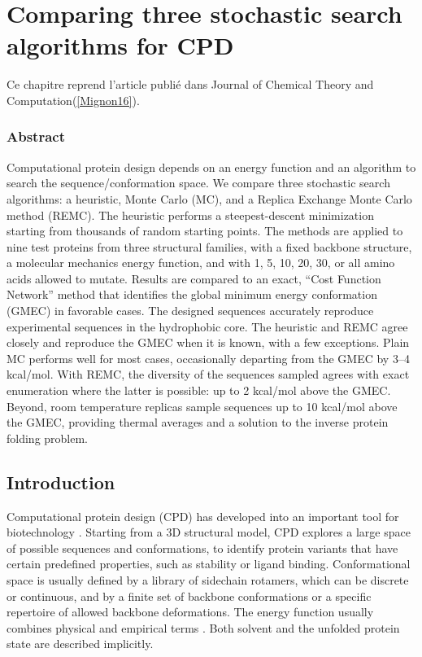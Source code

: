 \chapter{Comparing three stochastic search algorithms for CPD}
\label{chap:Comparaison}


Ce chapitre reprend l'article publié dans \og Journal of Chemical Theory and Computation\fg (\ref{Mignon16}).


\subsection*{Abstract}
Computational protein design depends on an energy function and an algorithm to search the sequence/conformation space. We compare three stochastic search algorithms: a heuristic, Monte Carlo (MC), and a Replica Exchange Monte Carlo method (REMC). The heuristic performs a steepest-descent minimization starting from thousands of random starting points. The methods are applied to nine test proteins from three structural families, with a fixed backbone structure, a molecular mechanics energy function, and with 1, 5, 10, 20, 30, or all amino acids allowed to mutate. Results are compared to an exact, “Cost Function Network” method that identifies the global minimum energy conformation (GMEC) in favorable cases. The designed sequences accurately reproduce experimental sequences in the hydrophobic core. The heuristic and REMC agree closely and reproduce the GMEC when it is known, with a few exceptions. Plain MC performs well for most cases, occasionally departing from the GMEC by 3–4 kcal/mol. With REMC, the diversity of the sequences sampled agrees with exact enumeration where the latter is possible: up to 2 kcal/mol above the GMEC. Beyond, room temperature replicas sample sequences up to 10 kcal/mol above the GMEC, providing thermal averages and a solution to the inverse protein folding problem.

\pagebreak

\section{Introduction}
Computational protein design (CPD) has developed into an important tool for biotechnology \cite{Dantas03,
Kuhlman06,Lippow07,Saven11,Feldmeier13,Tinberg13}. Starting from a 3D structural model, CPD explores a large
space of possible sequences and conformations, to identify protein variants that have certain predefined properties,
such as stability or ligand binding. Conformational space is usually defined by a library of sidechain rotamers,
which can be discrete or continuous, and by a finite set of backbone conformations or a specific repertoire
of allowed backbone deformations. The energy function usually combines physical and empirical terms \cite{Pokala04,
Samish11,Li13}. Both solvent and the unfolded protein state are described implicitly. 

